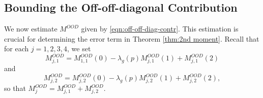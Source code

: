 \documentclass[12pt]{amsart}
\theoremstyle{plain}
\theoremstyle{definition}
\begin{document}
   





\subsection{Bounding the Off-off-diagonal Contribution} \label{sec:ood}

We now estimate $M^{OOD}$ given by \eqref{eqn:off-off-diag-contr}. This estimation is crucial for determining  the error term in Theorem \ref{thm:2nd moment}. Recall that for each $j=1,2,3,4$, we set
    \begin{equation}\label{eqn:MOODj1}
     M^{OOD}_{j, 1}
     =  M^{OOD}_{1, 1}(0)
     -\lambda_g(p)  M^{OOD}_{j, 1}(1)
     + M^{OOD}_{j, 1}(2)
    \end{equation}
and
    \begin{equation}\label{eqn:MOODj2}
     M^{OOD}_{j, 2}
     =  M^{OOD}_{j, 2}(0)
     -\lambda_g(p)  M^{OOD}_{j, 2}(1)
     + M^{OOD}_{j, 2}(2),
    \end{equation}
    so that $M^{OOD}_j=M^{OOD}_{j, 1}+M^{OOD}_{j, 2}$.
    
\end{document}

